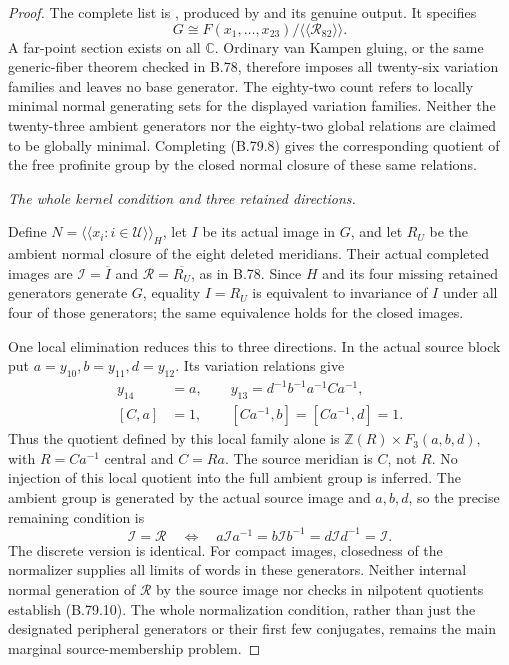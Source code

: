 \begin{proof}
The complete list is
, produced
by  and
its genuine output. It specifies
\[
             G\cong F(x_1,\ldots,x_{23})/
                         \langle\!\langle\mathscr R_{82}\rangle\!\rangle.
 \tag{B.79.8}
\]
A far-point section exists on all \(\mathbb C\). Ordinary van Kampen
gluing, or the same generic-fiber theorem checked in B.78, therefore
imposes all twenty-six variation families and leaves no base generator.
The eighty-two count refers to locally minimal normal generating
sets for the displayed variation families. Neither the twenty-three
ambient generators nor the eighty-two global relations are claimed
to be globally minimal. Completing (B.79.8) gives the corresponding quotient
of the free profinite group by the closed normal closure of these
same relations.

\emph{The whole kernel condition and three retained directions.}\par
Define \(N=\langle\!\langle x_i:i\in\mathcal U\rangle\!\rangle_H\),
let \(I\) be its actual image in \(G\), and let \(R_U\) be the
ambient normal closure of the eight deleted meridians. Their actual
completed images are \(\mathcal I=\overline I\) and
\(\mathcal R=\overline{R_U}\), as in B.78. Since \(H\) and its four
missing retained generators generate \(G\), equality \(I=R_U\)
is equivalent to invariance of \(I\) under all four of those generators;
the same equivalence holds for the closed images.

One local elimination reduces this to three directions. In the actual
source block put \(a=y_{10}, b=y_{11}, d=y_{12}\). Its variation
relations give
\[
 \begin{split}
 y_{14}&=a,\qquad
 y_{13}=d^{-1}b^{-1}a^{-1}Ca^{-1},\\
 [C,a]&=1,\qquad [Ca^{-1},b]=[Ca^{-1},d]=1.
 \end{split}
 \tag{B.79.9}
\]
Thus the quotient defined by this local family alone is
\(\mathbb Z(R)\times F_3(a,b,d)\), with
\(R=Ca^{-1}\) central and \(C=Ra\). The source meridian is \(C\),
not \(R\). No injection of this local quotient into the full ambient
group is inferred. The ambient group is generated by the actual source image
and \(a,b,d\), so the precise remaining condition is
\[
 \mathcal I=\mathcal R
 \quad\Longleftrightarrow\quad
 a\mathcal I a^{-1}=b\mathcal I b^{-1}
                       =d\mathcal I d^{-1}=\mathcal I.
 \tag{B.79.10}
\]
The discrete version is identical. For compact images, closedness of
the normalizer supplies all limits of words in these generators.
Neither internal normal generation of \(\mathcal R\) by the source
image nor checks in nilpotent quotients establish (B.79.10). The whole
normalization condition, rather than just the designated peripheral
generators or their first few conjugates, remains the main marginal
source-membership problem.
\end{proof}
